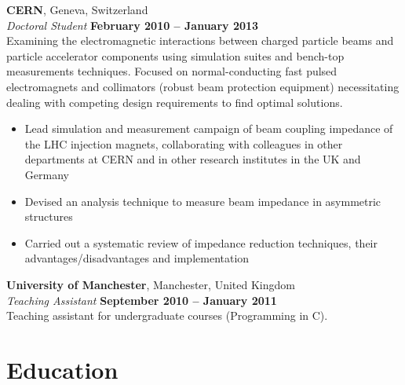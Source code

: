 \documentclass[margin,line]{resume}
\begin{document}
\begin{resume}
    \textbf{CERN}, Geneva, Switzerland \vspace{2mm}\\\vspace{1mm}%
    \textsl{Doctoral Student} \hfill \textbf{February 2010 -- January 2013}\\
    Examining the electromagnetic interactions between charged particle beams and particle accelerator components using simulation suites and bench-top measurements techniques. Focused on normal-conducting fast pulsed electromagnets and collimators (robust beam protection equipment) necessitating dealing with competing design requirements to find optimal solutions. 
    \begin{itemize}
    \item{Lead simulation and measurement campaign of beam coupling impedance of the LHC injection magnets, collaborating with colleagues in other departments at CERN and in other research institutes in the UK and Germany}
    \item{Devised an analysis technique to measure beam impedance in asymmetric structures}
    \item{Carried out a systematic review of impedance reduction techniques, their advantages/disadvantages and implementation}
    \end{itemize}

    \textbf{University of Manchester}, Manchester, United Kingdom \vspace{2mm}\\\vspace{1mm}%
    \textsl{Teaching Assistant} \hfill \textbf{September 2010 -- January 2011}\\
    Teaching assistant for undergraduate courses (Programming in C).


    \section{\mysidestyle Education}


\end{resume}
\end{document}
